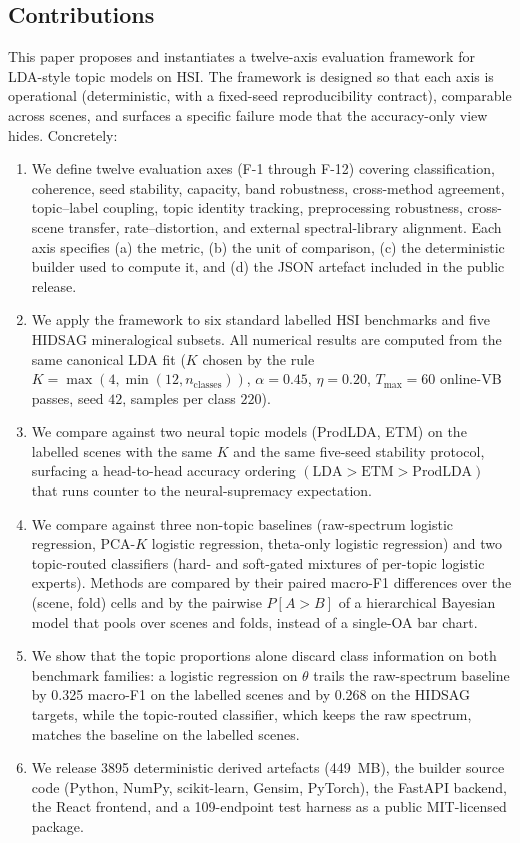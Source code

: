 \documentclass[journal,a4paper,10pt]{IEEEtran}
\begin{document}
\subsection{Contributions}

This paper proposes and instantiates a twelve-axis evaluation framework
for LDA-style topic models on HSI. The framework is designed so that
each axis is operational (deterministic, with a fixed-seed
reproducibility contract), comparable across scenes, and surfaces a
specific failure mode that the accuracy-only view hides. Concretely:

\begin{enumerate}
\item We define twelve evaluation axes (F-1 through F-12) covering
classification, coherence, seed stability, capacity, band robustness,
cross-method agreement, topic--label coupling, topic identity tracking,
preprocessing robustness, cross-scene transfer, rate--distortion, and
external spectral-library alignment. Each axis specifies (a) the metric, (b)
the unit of comparison, (c) the deterministic builder used to compute
it, and (d) the JSON artefact included in the public release.
\item We apply the framework to six standard labelled HSI benchmarks
and five HIDSAG mineralogical subsets. All numerical results are
computed from the same canonical LDA fit ($K$ chosen by the rule
$K = \max(4, \min(12, n_{\text{classes}}))$, $\alpha = 0.45$,
$\eta = 0.20$, $T_{\max} = 60$ online-VB passes, seed $42$, samples
per class $220$).
\item We compare against two neural topic models (ProdLDA, ETM) on
the labelled scenes with the same $K$ and the same five-seed stability
protocol, surfacing a head-to-head accuracy ordering
$(\text{LDA} > \text{ETM} > \text{ProdLDA})$ that runs counter to the
neural-supremacy expectation.
\item We compare against three non-topic baselines (raw-spectrum
logistic regression, PCA-$K$ logistic regression, theta-only logistic
regression) and two topic-routed classifiers (hard- and soft-gated
mixtures of per-topic logistic experts). Methods are compared by their
paired macro-F1 differences over the (scene, fold) cells and by the
pairwise $P[A > B]$ of a hierarchical Bayesian model that pools over
scenes and folds, instead of a single-OA bar chart.
\item We show that the topic proportions alone discard class
information on both benchmark families: a logistic regression on
$\theta$ trails the raw-spectrum baseline by 0.325 macro-F1 on the
labelled scenes and by 0.268 on the HIDSAG targets, while the
topic-routed classifier, which keeps the raw spectrum, matches the
baseline on the labelled scenes.
\item We release 3895 deterministic derived artefacts (449~MB), the
builder source code (Python, NumPy, scikit-learn, Gensim, PyTorch),
the FastAPI backend, the React frontend, and a 109-endpoint test
harness as a public MIT-licensed package.
\end{enumerate}
\end{document}
